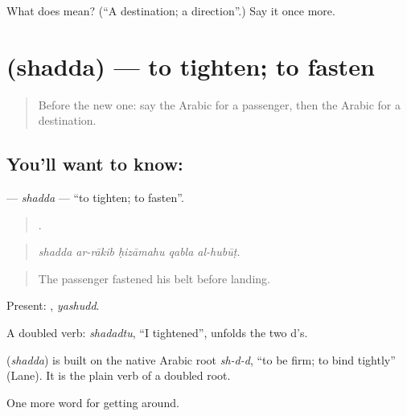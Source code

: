 \begin{tcolorbox}[breakable,colback=teal!4,colframe=teal!35!black,title={Before you move on}]
What does  mean? (\textquotedblleft{}A destination; a direction\textquotedblright{}.) Say it once more.
\end{tcolorbox}
\section[\texorpdfstring{\ar{شد} (shadda)}{شد (shadda)}]{ (shadda) — to tighten; to fasten}

\label{lesson:AR-C425-shadda}



\begin{quote}
Before the new one: say the Arabic for a passenger, then the Arabic for a destination.
\end{quote}

\subsection*{You'll want to know: }
\textbf{} — \emph{shadda} — \textquotedblleft{}to tighten; to fasten\textquotedblright{}.

\begin{quote}
    .
\end{quote}

\begin{quote}
\emph{shadda ar-rākib ḥizāmahu qabla al-hubūṭ.}
\end{quote}

\begin{quote}
The passenger fastened his belt before landing.
\end{quote}

Present: , \emph{yashudd}.

A doubled verb: \emph{shadadtu}, \textquotedblleft{}I tightened\textquotedblright{}, unfolds the two d's.

\begin{cousinweb}
\textbf{} (\emph{shadda}) is built on the native Arabic root \emph{sh-d-d}, \textquotedblleft{}to be firm; to bind tightly\textquotedblright{} (Lane). It is the plain verb of a doubled root.
\end{cousinweb}

\begin{grammarlens}[title={What you've built}]
One more word for getting around.
\end{grammarlens}

